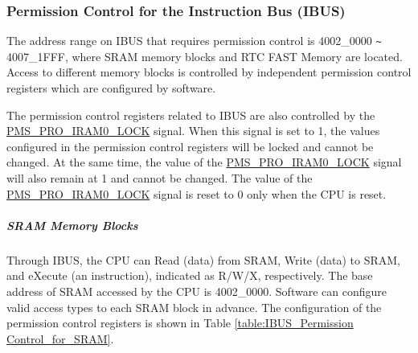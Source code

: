 \documentclass[main\_\_EN.tex]{subfiles}
\begin{document}
\subsubsection{Permission Control for the Instruction Bus (IBUS)}\label{Permission Control for the Instruction Bus (IBUS)}
The address range on IBUS that requires permission control is \hexprefix{}4002\_0000 \verb+~+ \hexprefix{}4007\_1FFF, where SRAM memory blocks and RTC FAST Memory are located. Access to different memory blocks is controlled by independent permission control registers which are configured by software.

The permission control registers related to IBUS are also controlled by the \hyperref[fielddesc:PMSPROIRAM0LOCK]{PMS\_PRO\_IRAM0\_LOCK} signal. When this signal is set to 1, the values configured in the permission control registers will be locked and cannot be changed. At the same time, the value of the \hyperref[fielddesc:PMSPROIRAM0LOCK]{PMS\_PRO\_IRAM0\_LOCK} signal will also remain at 1 and cannot be changed. The value of the \hyperref[fielddesc:PMSPROIRAM0LOCK]{PMS\_PRO\_IRAM0\_LOCK} signal is reset to 0 only when the CPU is reset.

\subparagraph{SRAM Memory Blocks}\label{IBUSSRAM}
Through IBUS, the CPU can Read (data) from SRAM, Write (data) to SRAM, and eXecute (an instruction), indicated as R/W/X, respectively. The base address of SRAM accessed by the CPU is \hexprefix{}4002\_0000. Software can configure valid access types to each SRAM block in advance. The configuration of the permission control registers is shown in Table \ref{table:IBUS_Permission Control_for_SRAM}.
\end{document}
